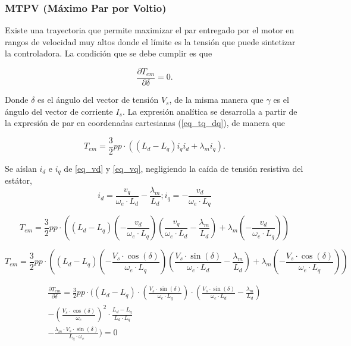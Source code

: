 \subsubsection{MTPV (Máximo Par por Voltio)}

Existe una trayectoria que permite maximizar el par entregado por el motor en rangos de velocidad muy altos donde el límite es la tensión que puede sintetizar la controladora. La condición que se debe cumplir es que

\begin{equation}
\frac{\partial T_{em}}{\partial \delta} = 0 \text{.}
\end{equation}

Donde $\delta$ es el ángulo del vector de tensión $V_s$, de la misma manera que $\gamma$ es el ángulo del vector de corriente $I_s$. La expresión analítica se desarrolla a partir de la expresión de par en coordenadas cartesianas (\ref{eq_tq_dq}), de manera que

\begin{equation*}
T_{em} = \frac{3}{2}pp\cdot((L_d - L_q) i_q i_d + \lambda_m i_q) \text{.}
\end{equation*}

Se aíslan $i_d$ e $i_q$ de \ref{eq_vd} y \ref{eq_vq}, negligiendo la caída de tensión resistiva del estátor, 
\begin{equation}
i_d = \frac{v_q}{\omega_e \cdot L_d} - \frac{\lambda_m}{L_d}; i_q = -\frac{v_d}{\omega_e \cdot L_q}
\end{equation}

\begin{equation}
T_{em} = \frac{3}{2}pp\cdot\left((L_d - L_q) (-\frac{v_d}{\omega_e \cdot L_q}) (\frac{v_q}{\omega_e \cdot L_d} - \frac{\lambda_m}{L_d}) + \lambda_m (-\frac{v_d}{\omega_e \cdot L_q})\right)
\end{equation}

\begin{equation}
T_{em} = \frac{3}{2}pp\cdot\left((L_d - L_q) (-\frac{V_s \cdot \cos(\delta)}{\omega_e \cdot L_q}) (\frac{V_s \cdot \sin(\delta)}{\omega_e \cdot L_d} - \frac{\lambda_m}{L_d}) + \lambda_m (-\frac{V_s \cdot \cos(\delta)}{\omega_e \cdot L_q})\right)
\end{equation}

\begin{equation}
\begin{split}
\frac{\partial T_{em}}{\partial \delta} = \frac{3}{2}pp\cdot (
(L_d - L_q) \cdot (\frac{V_s \cdot \sin(\delta)}{\omega_e \cdot L_q}) \cdot (\frac{V_s \cdot \sin(\delta)}{\omega_e \cdot L_d} - \frac{\lambda_m}{L_d})\\
-\left(\frac{V_s \cdot \cos(\delta)}{\omega_e}\right)^2 \cdot \frac{L_d - L_q}{L_d\cdot L_q}\\ 
-\frac{\lambda_m \cdot V_s \cdot \sin(\delta)}{L_q \cdot \omega_e} ) = 0
\end{split}
\end{equation}


